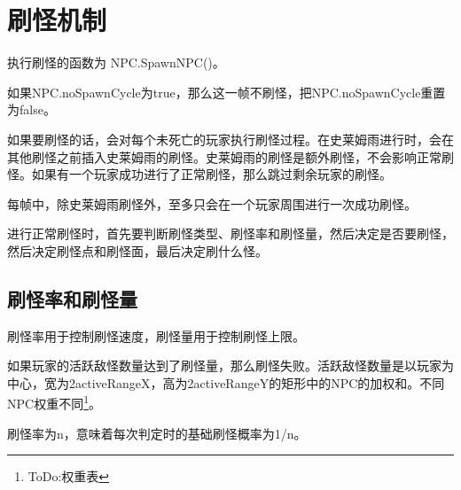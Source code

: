 \chapter{刷怪机制}
执行刷怪的函数为 NPC.SpawnNPC()。

如果NPC.noSpawnCycle为true，那么这一帧不刷怪，把NPC.noSpawnCycle重置为false。

如果要刷怪的话，会对每个未死亡的玩家执行刷怪过程。在史莱姆雨进行时，会在其他刷怪之前插入史莱姆雨的刷怪。史莱姆雨的刷怪是额外刷怪，不会影响正常刷怪。如果有一个玩家成功进行了正常刷怪，那么跳过剩余玩家的刷怪。

\begin{remark}
每帧中，除史莱姆雨刷怪外，至多只会在一个玩家周围进行一次成功刷怪。
\end{remark}

进行正常刷怪时，首先要判断刷怪类型、刷怪率和刷怪量，然后决定是否要刷怪，然后决定刷怪点和刷怪面，最后决定刷什么怪。

\section{刷怪率和刷怪量}
刷怪率用于控制刷怪速度，刷怪量用于控制刷怪上限。

如果玩家的活跃敌怪数量达到了刷怪量，那么刷怪失败。活跃敌怪数量是以玩家为中心，宽为2activeRangeX，高为2activeRangeY的矩形中的NPC的加权和。不同NPC权重不同\footnote{ToDo:权重表}。

刷怪率为n，意味着每次判定时的基础刷怪概率为1/n。

